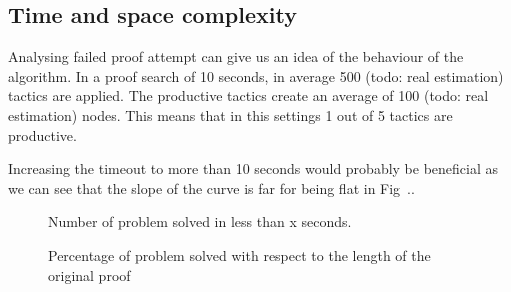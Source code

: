 \documentclass[runningheads,a4paper,draft]{svjour3}
\def\eprover{\textsf{E-prover}\xspace}
\def\tactictoe{\textsf{TacticToe}\xspace}
\begin{document}
\subsection{Time and space complexity}

Analysing failed proof attempt can give us an idea of the behaviour of the 
algorithm. In a proof search of 10 seconds, in average 500 (todo: real 
estimation) tactics are applied.
The productive tactics create an average of 100 (todo: real estimation) nodes. 
This means that in this settings 1 out of 5 tactics are productive.

Increasing the timeout to more than 10 seconds would probably be beneficial as 
we can see that the slope of the curve is far for being flat in Fig~..


\begin{figure}[h]
\centering           
{}
\caption{Number of problem solved in less than x seconds.}
\end{figure}

\begin{figure}[h]
\centering           
{}
\caption{Percentage of problem solved with respect to the length of the 
original 
proof}
\end{figure}
\end{document}
